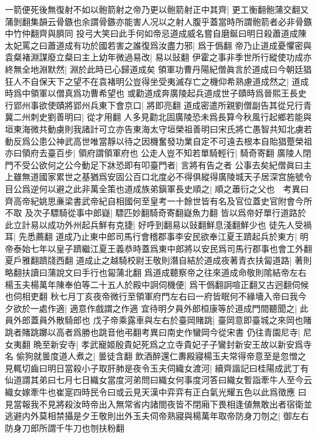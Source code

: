 一箭便死後無復射不如以骲箭射之帝乃更以骲箭射正中其齊|{
	更工衡翻骲蒲交翻又蒲剝翻集韻云骨鏃也余謂骨鏃亦能害人况以之射人腹乎蓋當時所謂骲箭者必非骨鏃中竹仲翻齊與臍同}
投弓大笑曰此手何如帝忌道成威名嘗自磨鋋曰明日殺蕭道成陳太妃罵之曰蕭道成有功於國若害之誰復爲汝盡力邪|{
	爲于僞翻}
帝乃止道成憂懼密與袁粲褚淵謀廢立粲曰主上幼年微過易改|{
	易以䜴翻}
伊霍之事非季世所行縱使功成亦終無全地淵默然|{
	淵於此時已心歸道成矣}
領軍功曹丹陽紀僧眞言於道成曰今朝廷猖狂人不自保天下之望不在袁褚明公豈得坐受夷滅存亡之機仰希熟慮道成然之|{
	道成時爲中領軍以僧真爲功曹希望也}
或勸道成奔廣陵起兵道成世子賾時爲晉熙王長史行郢州事欲使賾將郢州兵東下會京口|{
	將即亮翻}
道成密遣所親劉僧副告其從兄行青冀二州刺史劉善明曰|{
	從才用翻}
人多見勸北固廣陵恐未爲長算今秋風行起鄉若能與垣東海微共動虜則我諸計可立亦告東海太守垣榮祖善明曰宋氏將亡愚智共知北虜若動反爲公患公神武高世唯當靜以待之因機奮發功業自定不可遠去根本自貽猖蹷榮祖亦曰領府去臺百步|{
	領府謂領軍府也}
公走人豈不知若單騎輕行|{
	騎奇寄翻}
廣陵人閉門不受公欲何之公今動足下牀恐即有叩臺門者|{
	言將有告之者}
公事去矣紀僧眞曰主上雖無道國家累世之基猶爲安固公百口北度必不得俱縱得廣陵城天子居深宫施號令目公爲逆何以避之此非萬全策也道成族弟鎭軍長史順之|{
	順之蕭衍之父也　考異曰齊高帝紀姚思亷梁書武帝紀自相國何至皇考一十餘世皆有名及官位蓋史官附會今所不取}
及次子驃騎從事中郎嶷|{
	驃匹妙翻騎奇寄翻嶷魚力翻}
皆以爲帝好單行道路於此立計易以成功外州起兵鮮有克捷|{
	好呼到翻易以䜴翻鮮息淺翻鮮少也}
徒先人受禍耳|{
	先悉薦翻}
道成乃止東中郎司馬行會稽郡事李安民欲奉江夏王躋起兵於東方|{
	明帝泰始七年以皇子躋繼江夏王義恭時蓋爲東中郎將以安民爲司馬行郡事也會工外翻夏戶雅翻躋牋西翻}
道成止之越騎校尉王敬則潛自結於道成夜著青衣扶匐道路|{
	著則略翻扶讀曰蒲說文曰手行也匐蒲北翻}
爲道成聽察帝之往來道成命敬則隂結帝左右楊玉夫楊萬年陳奉伯等二十五人於殿中詗伺機便|{
	爲干僞翻詗喧正翻又古迥翻伺候也伺相吏翻}
秋七月丁亥夜帝微行至領軍府門左右曰一府皆眠何不緣墻入帝曰我今夕欲於一處作適|{
	適意作戲謂之作適}
宜待明夕員外郎桓康等於道成門間聽聞之|{
	此員外郎蓋員外散騎郎也}
戊子帝乘露車與左右於臺岡賭跳|{
	臺岡意即臺城之來岡也賭跳者賭跳躑以高者爲勝也跳音他弔翻考異曰南史作蠻岡今從宋書}
仍往青園尼寺|{
	尼女夷翻}
晩至新安寺|{
	孝武寵姬殷貴妃死爲之立寺貴妃子子鸞封新安王故以新安爲寺名}
偷狗就曇度道人煮之|{
	曇徒含翻}
飲酒醉還仁夀殿寢楊玉夫常得帝意至是忽憎之見輒切齒曰明日當殺小子取肝肺是夜令玉夫伺織女渡河|{
	續齊諧記曰桂陽成武丁有仙道謂其弟曰七月七日織女當度河弟問曰織女何事度河答曰織女暫詣牽牛人至今云織女嫁牽牛也崔寔四時民令曰或云見天漢中弈弈有正白氣光耀五色以此爲徵應}
曰見當報我不見將殺汝時帝出入無常省内諸閤夜皆不閉廂下畏相逢値無敢出者宿衛並逃避内外莫相禁攝是夕王敬則出外玉夫伺帝熟寢與楊萬年取帝防身刀刎之|{
	御左右防身刀郎所謂千牛刀也刎扶粉翻}
